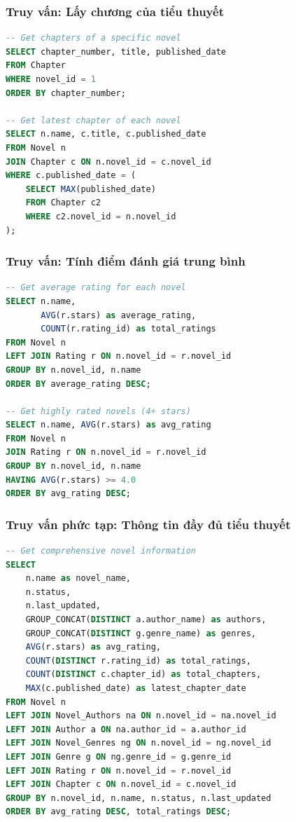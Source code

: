 \documentclass[12pt,aspectratio=169,handout]{beamer}
\begin{document}
\begin{frame}[fragile]
\frametitle{Truy vấn: Lấy chương của tiểu thuyết}
\begin{lstlisting}[language=SQL, basicstyle=\small\ttfamily]
-- Get chapters of a specific novel
SELECT chapter_number, title, published_date 
FROM Chapter 
WHERE novel_id = 1 
ORDER BY chapter_number;

-- Get latest chapter of each novel
SELECT n.name, c.title, c.published_date
FROM Novel n
JOIN Chapter c ON n.novel_id = c.novel_id
WHERE c.published_date = (
    SELECT MAX(published_date) 
    FROM Chapter c2 
    WHERE c2.novel_id = n.novel_id
);
\end{lstlisting}
\end{frame}

\begin{frame}[fragile]
\frametitle{Truy vấn: Tính điểm đánh giá trung bình}
\begin{lstlisting}[language=SQL, basicstyle=\small\ttfamily]
-- Get average rating for each novel
SELECT n.name, 
       AVG(r.stars) as average_rating, 
       COUNT(r.rating_id) as total_ratings
FROM Novel n
LEFT JOIN Rating r ON n.novel_id = r.novel_id
GROUP BY n.novel_id, n.name
ORDER BY average_rating DESC;

-- Get highly rated novels (4+ stars)
SELECT n.name, AVG(r.stars) as avg_rating
FROM Novel n
JOIN Rating r ON n.novel_id = r.novel_id
GROUP BY n.novel_id, n.name
HAVING AVG(r.stars) >= 4.0
ORDER BY avg_rating DESC;
\end{lstlisting}
\end{frame}

\begin{frame}[fragile]
\frametitle{Truy vấn phức tạp: Thông tin đầy đủ tiểu thuyết}
\begin{lstlisting}[language=SQL, basicstyle=\tiny\ttfamily]
-- Get comprehensive novel information
SELECT 
    n.name as novel_name,
    n.status,
    n.last_updated,
    GROUP_CONCAT(DISTINCT a.author_name) as authors,
    GROUP_CONCAT(DISTINCT g.genre_name) as genres,
    AVG(r.stars) as avg_rating,
    COUNT(DISTINCT r.rating_id) as total_ratings,
    COUNT(DISTINCT c.chapter_id) as total_chapters,
    MAX(c.published_date) as latest_chapter_date
FROM Novel n
LEFT JOIN Novel_Authors na ON n.novel_id = na.novel_id
LEFT JOIN Author a ON na.author_id = a.author_id
LEFT JOIN Novel_Genres ng ON n.novel_id = ng.novel_id
LEFT JOIN Genre g ON ng.genre_id = g.genre_id
LEFT JOIN Rating r ON n.novel_id = r.novel_id
LEFT JOIN Chapter c ON n.novel_id = c.novel_id
GROUP BY n.novel_id, n.name, n.status, n.last_updated
ORDER BY avg_rating DESC, total_ratings DESC;
\end{lstlisting}
\end{frame}
\end{document}
